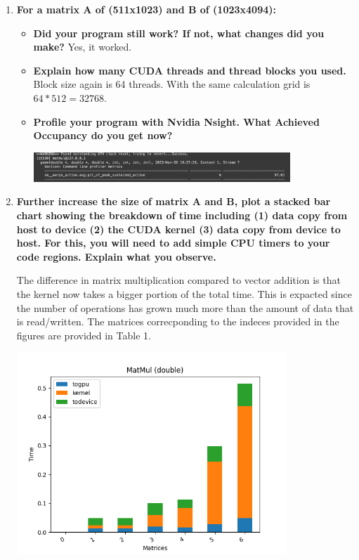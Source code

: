 \documentclass[a4paper,11pt]{scrartcl}
\begin{document}
\begin{enumerate}
\item \textbf{For a matrix A of (511x1023) and B of (1023x4094):}
\begin{itemize}
    \item \textbf{Did your program still work? If not, what changes did you make?}
    Yes, it worked.

    \item \textbf{Explain how many CUDA threads and thread blocks you used.}
    Block size again is 64 threads. With the same calculation grid is $64*512=32768$.

    \item \textbf{Profile your program with Nvidia Nsight. What Achieved Occupancy do you get now?}

    \includegraphics*[width=0.8\textwidth]{images/ach_occ4.png}

\end{itemize}

\item \textbf{Further increase the size of matrix A and B, plot a stacked bar chart showing the breakdown of time including (1) data copy from host to device (2) the CUDA kernel (3) data copy from device to host. For this, you will need to add simple CPU timers to your code regions. Explain what you observe.}

The difference in matrix multiplication compared to vector addition is that the kernel now takes a bigger portion of the total time. This is expacted since the number of operations has grown much more than the amount of data that is read/written. The matrices correcponding to the indeces provided in the figures are provided in Table 1.

\includegraphics*[width=0.8\textwidth]{images/ex2.png}


\end{enumerate}
\end{document}
